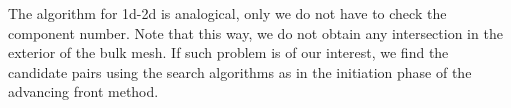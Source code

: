 The algorithm for 1d-2d is analogical, only we do not have to check the component number.
Note that this way, we do not obtain any intersection in the exterior of the bulk mesh.
If such problem is of our interest, we find the candidate pairs using the search algorithms as in
the initiation phase of the advancing front method.








